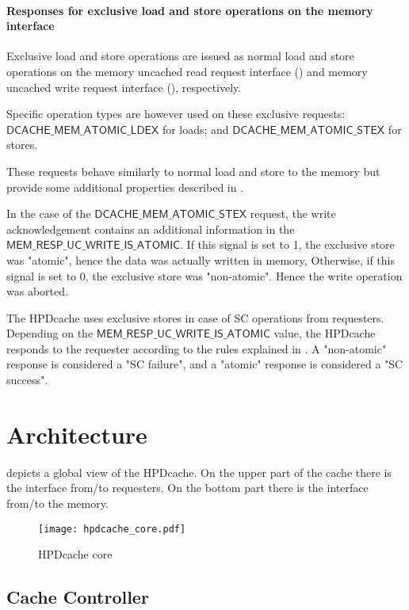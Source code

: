 \documentclass[10pt,titlepage,twoside]{book}
\begin{document}
\subsubsection{Responses for exclusive load and store operations on the memory interface}

Exclusive load and store operations are issued as normal load and store operations on the memory uncached read request interface () and memory uncached write request interface (), respectively.

Specific operation types are however used on these exclusive requests:
$\mathsf{DCACHE\_MEM\_ATOMIC\_LDEX}$ for loads; and $\mathsf{DCACHE\_MEM\_ATOMIC\_STEX}$ for stores.

These requests behave similarly to normal load and store to the memory but provide some additional properties described in .

In the case of the $\mathsf{DCACHE\_MEM\_ATOMIC\_STEX}$ request, the write acknowledgement contains an additional information in the $\mathsf{MEM\_RESP\_UC\_WRITE\_IS\_ATOMIC}$.
If this signal is set to 1, the exclusive store was "atomic", hence the data was actually written in memory,
Otherwise, if this signal is set to 0, the exclusive store was "non-atomic".
Hence the write operation was aborted.

The \ac{HPDcache} uses exclusive stores in case of \ac{SC} operations from requesters.
Depending on the $\mathsf{MEM\_RESP\_UC\_WRITE\_IS\_ATOMIC}$ value, the \ac{HPDcache} responds to the requester according to the rules explained in .
A "non-atomic" response is considered a "SC failure", and a "atomic" response is considered a "SC success".

\clearpage
\chapter{Architecture}
\minitoc
\newpage

 depicts a global view of the \ac{HPDcache}.
On the upper part of the cache there is the interface from/to requesters.
On the bottom part there is the interface from/to the memory.

\begin{figure}[htbp]
  \texttt{[image: hpdcache\_core.pdf]}
  \caption{HPDcache core}
\end{figure}

\section{Cache Controller}
\end{document}
